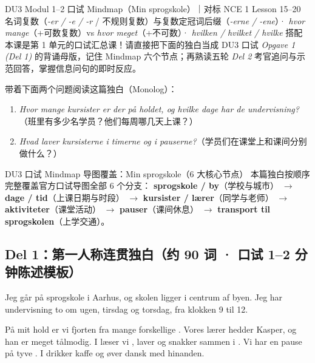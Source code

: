 {DU3 Modul 1--2 口试 Mindmap（Min sprogskole）｜对标 NCE 1 Lesson 15--20}
{名词复数（\textit{-er / -e / -r} / 不规则复数）与复数定冠词后缀（\textit{-erne / -ene}）· \textit{hvor mange}（+可数复数）vs \textit{hvor meget}（+不可数）· \textit{hvilken / hvilket / hvilke} 搭配}
{本课是第 1 单元的口试汇总课！请直接把下面的独白当成 DU3 口试 \textit{Opgave 1 (Del 1)} 的背诵母版，记住 Mindmap 六个节点；再熟读五轮 \textit{Del 2} 考官追问与示范回答，掌握信息问句的即时反应。}

\begin{foerduleaeser}
带着下面两个问题阅读这篇独白（Monolog）：
\begin{enumerate}
  \item \textit{Hvor mange kursister er der på holdet, og hvilke dage har de undervisning?}（班里有多少名学员？他们每周哪几天上课？）
  \item \textit{Hvad laver kursisterne i timerne og i pauserne?}（学员们在课堂上和课间分别做什么？）
\end{enumerate}
\end{foerduleaeser}


\begin{tipbox}{DU3 口试 Mindmap 导图覆盖：Min sprogskole（6 大核心节点）}
\small
本篇独白按顺序完整覆盖官方口试导图全部 6 个分支：
\textbf{ sprogskole / by}（学校与城市） $\rightarrow$
\textbf{ dage / tid}（上课日期与时段） $\rightarrow$
\textbf{ kursister / lærer}（同学与老师） $\rightarrow$
\textbf{ aktiviteter}（课堂活动） $\rightarrow$
\textbf{ pauser}（课间休息） $\rightarrow$
\textbf{ transport til sprogskolen}（上学交通）。
\end{tipbox}

\subsection*{Del 1：第一人称连贯独白（约 90 词 · 口试 1--2 分钟陈述模板）}

Jeg går på sprogskole i Aarhus, og skolen ligger i centrum af byen. Jeg har undervisning to  om ugen, tirsdag og torsdag, fra klokken 9 til 12.

På mit hold er vi fjorten  fra mange forskellige . Vores lærer hedder Kasper, og han er meget tålmodig. I  læser vi , laver  og snakker sammen i . Vi har en pause på tyve . I  drikker  kaffe og øver dansk med hinanden.

